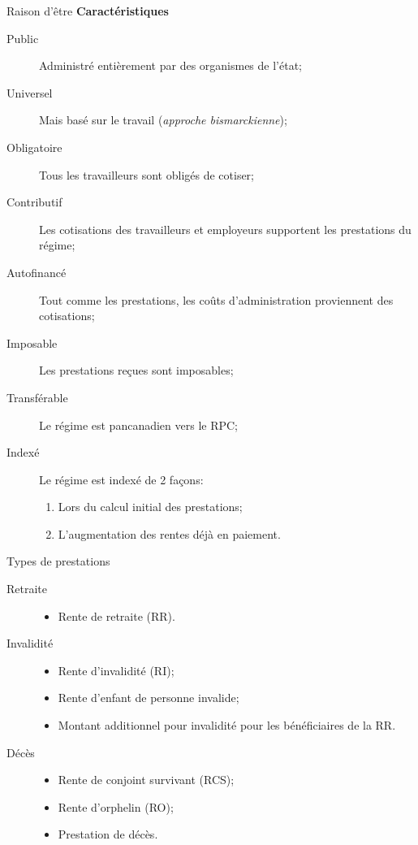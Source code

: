 \documentclass[10pt, french]{article}
\begin{document}
\begin{multicols*}{3}
\begin{conceptgen}{Raison d'être}
\textbf{Caractéristiques}
\begin{description}
	\item[Public]	Administré entièrement par des organismes de l'état;
	\item[Universel]	Mais basé sur le travail (\textit{approche bismarckienne});
	\item[Obligatoire]	Tous les travailleurs sont obligés de cotiser;
	\item[Contributif]	Les cotisations des travailleurs et employeurs supportent les prestations du régime;
	\item[Autofinancé]	Tout comme les prestations, les coûts d'administration proviennent des cotisations;
	\item[Imposable]	Les prestations reçues sont imposables;
	\item[Transférable]	Le régime est pancanadien vers le RPC;
	\item[Indexé]	Le régime est indexé de 2 façons:
		\begin{enumerate}[leftmargin = *]
		\item	Lors du calcul initial des prestations;
		\item	L'augmentation des rentes déjà en paiement.
		\end{enumerate}
\end{description}
\end{conceptgen}

\begin{conceptgen}{Types de prestations}
\begin{description}
	\item[Retraite]	
		\begin{itemize}[leftmargin = *]
		\item	Rente de retraite (RR).
		\end{itemize}
	\item[Invalidité]	
		\begin{itemize}[leftmargin = *]
		\item	Rente d'invalidité (RI);
		\item	Rente d'enfant de personne invalide;
		\item	Montant additionnel pour invalidité pour les bénéficiaires de la RR.
		\end{itemize}
	\item[Décès]	
		\begin{itemize}[leftmargin = *]
		\item	Rente de conjoint survivant (RCS);
		\item	Rente d'orphelin (RO);
		\item	Prestation de décès.
		\end{itemize}
\end{description}
\end{conceptgen}


\end{multicols*}
\end{document}
